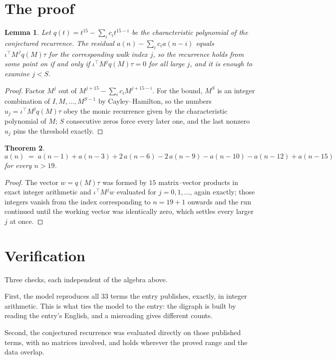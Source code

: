 \documentclass[11pt,a4paper]{article}
\theoremstyle{plain}
\newtheorem{theorem}{Theorem}
\newtheorem{lemma}[theorem]{Lemma}
\theoremstyle{definition}
\begin{document}
\section{The proof}

\begin{lemma}\label{lem:crit}
Let $q(t)=t^{15}-\sum_i c_it^{15-i}$ be the characteristic polynomial of the
conjectured recurrence. The residual $a(n)-\sum_ic_ia(n-i)$ equals
$\iota^{\!\top}M^{\,j}q(M)\tau$ for the corresponding walk index $j$, so the recurrence
holds from some point on if and only if $\iota^{\!\top}M^{j}q(M)\tau=0$ for all large $j$,
and it is enough to examine $j<S$.
\end{lemma}

\begin{proof}
Factor $M^{j}$ out of $M^{j+15}-\sum_ic_iM^{j+15-i}$. For the bound, $M^{S}$
is an integer combination of $I,M,\dots,M^{S-1}$ by Cayley--Hamilton, so the numbers
$u_j=\iota^{\!\top}M^{j}q(M)\tau$ obey the monic recurrence given by the characteristic
polynomial of $M$; $S$ consecutive zeros force every later one, and the last nonzero $u_j$
pins the threshold exactly.
\end{proof}

\begin{theorem}
\[
a(n)\;=\;a(n-1) + a(n-3) + 2\,a(n-6) - 2\,a(n-9) - a(n-10) - a(n-12) + a(n-15)
\]
for every $n>19$.
\end{theorem}

\begin{proof}
The vector $w=q(M)\tau$ was formed by $15$ matrix--vector products in exact integer
arithmetic and $\iota^{\!\top}M^{j}w$ evaluated for $j=0,1,\dots$, again exactly; those
integers vanish from the index corresponding to $n=19+1$ onwards and the run continued
until the working vector was identically zero, which settles every larger $j$ at once.
\end{proof}

\section{Verification}

Three checks, each independent of the algebra above.

First, the model reproduces all $33$ terms the entry publishes, exactly, in integer
arithmetic. This is what ties the model to the entry: the digraph is built by reading the
entry's English, and a misreading gives different counts.

Second, the conjectured recurrence was evaluated directly on those published terms, with no
matrices involved, and holds wherever the proved range and the data overlap.
\end{document}
